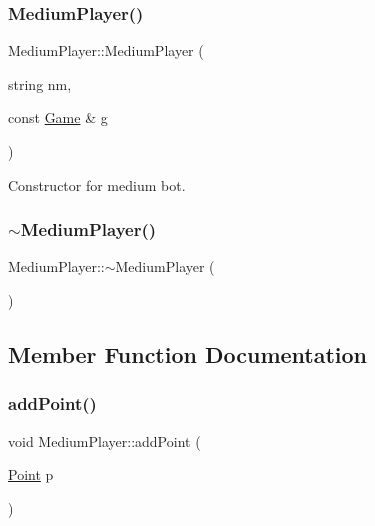 \subsubsection{\texorpdfstring{Medium\+Player()}{MediumPlayer()}}
{\footnotesize\ttfamily Medium\+Player\+::\+Medium\+Player (\begin{DoxyParamCaption}\item[{string}]{nm,  }\item[{const \mbox{\hyperlink{class_game}{Game}} \&}]{g }\end{DoxyParamCaption})\hspace{0.3cm}{\ttfamily [inline]}}



Constructor for medium bot. 

\mbox{\label{class_medium_player_a59749832be9905531c9b5eb0b67edf83}} 
\subsubsection{\texorpdfstring{$\sim$\+Medium\+Player()}{~MediumPlayer()}}
{\footnotesize\ttfamily Medium\+Player\+::$\sim$\+Medium\+Player (\begin{DoxyParamCaption}{ }\end{DoxyParamCaption})\hspace{0.3cm}{\ttfamily [inline]}}



\subsection{Member Function Documentation}
\mbox{\label{class_medium_player_a4cd5cbf0327e002112c80a52b279358f}} 
\subsubsection{\texorpdfstring{add\+Point()}{addPoint()}}
{\footnotesize\ttfamily void Medium\+Player\+::add\+Point (\begin{DoxyParamCaption}\item[{\mbox{\hyperlink{class_point}{Point}}}]{p }\end{DoxyParamCaption})\hspace{0.3cm}{\ttfamily [virtual]}}




